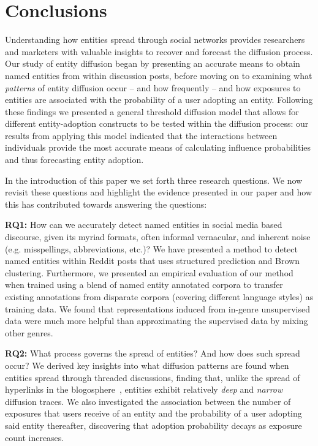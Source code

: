 \documentclass[sigconf]{acmart}
\begin{document}
\section{Conclusions}
\label{sec:conclusions}
Understanding how entities spread through social networks provides researchers and marketers with valuable insights to recover and forecast the diffusion process.
Our study of entity diffusion began by presenting an accurate means to obtain named entities from within discussion posts, before moving on to examining what \emph{patterns} of entity diffusion occur -- and how frequently -- and how exposures to entities are associated with the probability of a user adopting an entity.
Following these findings we presented a general threshold diffusion model that allows for different entity-adoption constructs to be tested within the diffusion process: our results from applying this model indicated that the interactions between individuals provide the most accurate means of calculating influence probabilities and thus forecasting entity adoption.

In the introduction of this paper we set forth three research questions. 
We now revisit these questions and highlight the evidence presented in our paper and how this has contributed towards answering the questions:

\textbf{RQ1:} How can we accurately detect named entities in social media based discourse, given its myriad formats, often informal vernacular, and inherent noise (e.g. misspellings, abbreviations, etc.)?
We have presented a method to detect named entities within Reddit posts that uses structured prediction and Brown clustering.
Furthermore, we presented an empirical evaluation of our method when trained using a blend of named entity annotated corpora to transfer existing annotations from disparate corpora (covering different language styles) as training data.
We found that representations induced from in-genre unsupervised data were much more helpful than approximating the supervised data by mixing other genres.

 \textbf{RQ2:} What process governs the spread of entities? And how does such spread occur?
We derived key insights into what diffusion patterns are found when entities spread through threaded discussions,  finding that, unlike the spread of hyperlinks in the blogosphere~\cite{leskovec2007patterns}, entities exhibit relatively \emph{deep} and \emph{narrow} diffusion traces.
We also investigated the association between the number of exposures that users receive of an entity and the probability of a user adopting said entity thereafter, discovering that adoption probability decays as exposure count increases.
\end{document}
